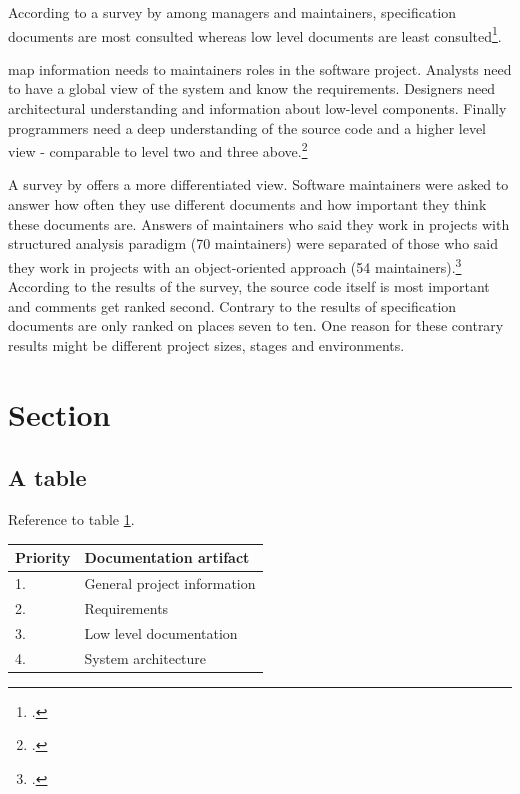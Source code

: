 According to a survey by \citeauthor{forward_relevance_2002} among managers and
maintainers, specification documents are most consulted whereas low level
documents are least consulted\footcite[Cf.][28-30]{forward_relevance_2002}.

\citeauthor{grubb2003software} map information needs to maintainers roles
in the software project. Analysts need to have a global view of the system and
know the requirements. Designers need architectural understanding and
information about low-level components. Finally programmers need a deep
understanding of the source code and a higher level view - comparable to level
two and three above.\footcite[Cf.][103-106]{grubb2003software}

A survey by \citeauthor{de_souza_study_2005} offers a more differentiated view.
Software maintainers were asked to answer how often they use different documents
and how important they think these documents are. Answers of maintainers who
said they work in projects with structured analysis paradigm (70 maintainers)
were separated of those who said they work in projects with an object-oriented
approach (54 maintainers).\footcite[Cf.][69-74]{de_souza_study_2005}
According to the results of the survey, the source code itself is most important
and comments get ranked second. Contrary to the results of \citeauthor{forward_relevance_2002}
specification documents are only ranked on places seven to ten.
One reason for these contrary results might be different project sizes, stages
and environments.


\FloatBarrier %
\newpage
\section{Section}

\subsection{A table}
\label{sec:atable}


Reference to table \ref{tab:importance_artifacts}.\\


\begin{table}[H]
\begin{center}
  \begin{tabular}{p{2cm}|p{8cm}}
	Priority &	Documentation artifact\\\hline
	1. &	General project information \\
	2. &	Requirements \\
	3. &	Low level documentation\\
	4. &	System architecture\\
  \end{tabular}
	\label{tab:importance_artifacts}
\end{center}
\end{table}





